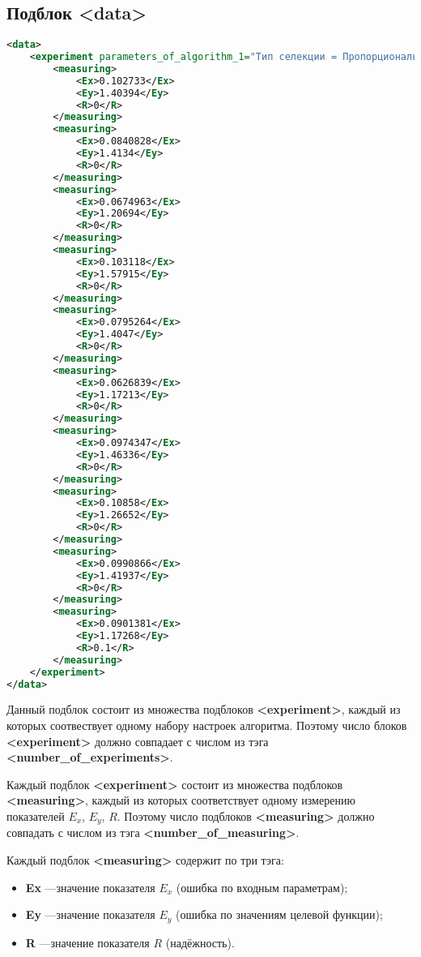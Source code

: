 \documentclass[a4paper,12pt]{article}
\begin{document}
\subsection{Подблок <data>}

\begin{lstlisting}[label=Part10, language=xml ,caption=Подблок в файле Harrix Optimization Testing]
<data>
	<experiment parameters_of_algorithm_1="Тип селекции = Пропорциональная селекция" parameters_of_algorithm_2="Тип скрещивания = Одноточечное скрещивание" parameters_of_algorithm_3="Тип мутации = Слабая мутация" parameters_of_algorithm_4="Тип формирования нового поколения = Только потомки" parameters_of_algorithm_5="Тип преобразования задачи вещественной оптимизации в задачу бинарной оптимизации = Стандартное представление целого числа - номер узла в сетке дискретизации">
		<measuring>
			<Ex>0.102733</Ex>
			<Ey>1.40394</Ey>
			<R>0</R>
		</measuring>
		<measuring>
			<Ex>0.0840828</Ex>
			<Ey>1.4134</Ey>
			<R>0</R>
		</measuring>
		<measuring>
			<Ex>0.0674963</Ex>
			<Ey>1.20694</Ey>
			<R>0</R>
		</measuring>
		<measuring>
			<Ex>0.103118</Ex>
			<Ey>1.57915</Ey>
			<R>0</R>
		</measuring>
		<measuring>
			<Ex>0.0795264</Ex>
			<Ey>1.4047</Ey>
			<R>0</R>
		</measuring>
		<measuring>
			<Ex>0.0626839</Ex>
			<Ey>1.17213</Ey>
			<R>0</R>
		</measuring>
		<measuring>
			<Ex>0.0974347</Ex>
			<Ey>1.46336</Ey>
			<R>0</R>
		</measuring>
		<measuring>
			<Ex>0.10858</Ex>
			<Ey>1.26652</Ey>
			<R>0</R>
		</measuring>
		<measuring>
			<Ex>0.0990866</Ex>
			<Ey>1.41937</Ey>
			<R>0</R>
		</measuring>
		<measuring>
			<Ex>0.0901381</Ex>
			<Ey>1.17268</Ey>
			<R>0.1</R>
		</measuring>
	</experiment>
</data>
\end{lstlisting}

Данный подблок состоит из множества подблоков \textbf{<experiment>}, каждый из которых соотвествует одному набору настроек алгоритма. Поэтому число блоков \textbf{<experiment>} должно совпадает с числом из тэга \textbf{<number\_of\_experiments>}.

Каждый подблок \textbf{<experiment>} состоит из множества подблоков \textbf{<measuring>}, каждый из которых соответствует одному измерению показателей $ E_x $, $ E_y $, $ R $. Поэтому число подблоков \textbf{<measuring>} должно совпадать с числом из тэга  \textbf{<number\_of\_measuring>}.

Каждый подблок \textbf{<measuring>} содержит по три тэга:
\begin{itemize}
\item \textbf{Ex} ---значение показателя $ E_x $ (ошибка по входным параметрам);
\item \textbf{Ey} ---значение показателя $ E_y $ (ошибка по значениям целевой функции);
\item \textbf{R} ---значение показателя $ R $ (надёжность).
\end{itemize} 
\end{document}
